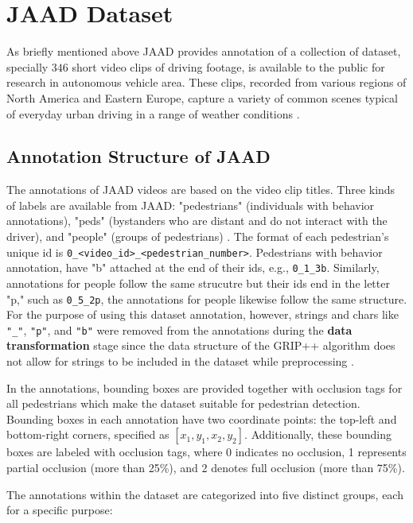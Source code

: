 \section{JAAD Dataset}

\tab As briefly mentioned above JAAD provides annotation of a collection of dataset, specially \(346\) short video clips of driving footage, is available to the public for research in autonomous vehicle area. These clips, recorded from various regions of North America and Eastern Europe, capture a variety of common scenes typical of everyday urban driving in a range of weather conditions \cite{rasouli2017ICCVW}. 

\subsection{Annotation Structure of JAAD}

\tab The annotations of JAAD videos are based on the video clip titles. Three kinds of labels are available from JAAD: "pedestrians" (individuals with behavior annotations), "peds" (bystanders who are distant and do not interact with the driver), and "people" (groups of pedestrians) \cite{rasouli2017ICCVW}. The format of each pedestrian's unique id is \verb|0_<video_id>_<pedestrian_number>|. Pedestrians with behavior annotation, have "b" attached at the end of their ids, e.g., \verb|0_1_3b|. Similarly, annotations for people follow the same strucutre but their ids end in the letter "p," such as \verb|0_5_2p|, the annotations for people likewise follow the same structure. For the purpose of using this dataset annotation, however, strings and chars like \verb|"_"|, \verb|"p"|, and \verb|"b"| were removed from the annotations during the \textbf{data transformation} stage since the data structure of the GRIP++ algorithm does not allow for strings to be included in the dataset while preprocessing \cite{ma2019trafficpredict}.

\tab In the annotations, bounding boxes are provided together with occlusion tags for all pedestrians which make the dataset suitable for pedestrian detection. Bounding boxes in each annotation have two coordinate points: the top-left and bottom-right corners, specified as \([x_1, y_1, x_2, y_2]\). Additionally, these bounding boxes are labeled with occlusion tags, where 0 indicates no occlusion, 1 represents partial occlusion (more than 25\%), and 2 denotes full occlusion (more than 75\%).

\tab The annotations within the dataset are categorized into five distinct groups, each for a specific purpose:

